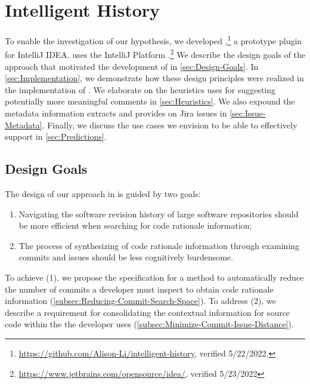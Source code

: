 \chapter{Intelligent History}
\label{ch:Intelligent-History}

To enable the investigation of our hypothesis, we developed ,\footnote{\url{https://github.com/Alison-Li/intelligent-history}, verified 5/22/2022.} a prototype plugin for IntelliJ IDEA.
 uses the IntelliJ Platform .\footnote{\url{https://www.jetbrains.com/opensource/idea/}, verified 5/23/2022}
We describe the design goals of the approach that motivated the development of  in \autoref{sec:Design-Goals}. 
In \autoref{sec:Implementation}, we demonstrate how these design principles were realized in the implementation of . 
We elaborate on the heuristics  uses
for suggesting potentially more meaningful comments in \autoref{sec:Heuristics}.
We also expound the metadata information  extracts and provides on Jira issues in \autoref{sec:Issue-Metadata}. 
Finally, we discuss the use cases we envision  to be able to effectively support in \autoref{sec:Predictions}.

\section{Design Goals}
\label{sec:Design-Goals}

The design of our approach in  is guided by two goals: 

\begin{enumerate}[label={(\arabic*)}]
    \item Navigating the software revision history of large software repositories should be more efficient when searching for code rationale information;
    \item The process of synthesizing of code rationale information through examining commits and issues should be less cognitively burdensome.
\end{enumerate}

To achieve (1), we propose the specification for a method to automatically reduce the number of commits a developer must inspect to obtain code rationale information (\autoref{subsec:Reducing-Commit-Search-Space}).
To address (2), we describe a requirement for consolidating the contextual information for source code within the  the developer uses (\autoref{subsec:Minimize-Commit-Issue-Distance}).

